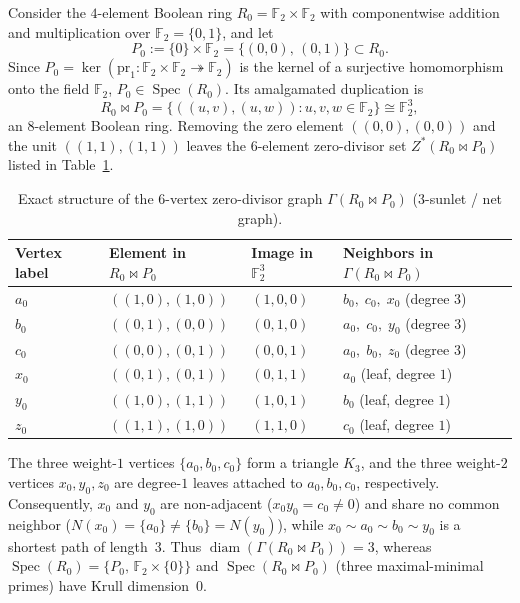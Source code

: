 \documentclass[11pt]{article}
\theoremstyle{definition}
\newcommand{\Spec}{\operatorname{Spec}}
\newcommand{\diam}{\operatorname{diam}}
\newcommand{\FF}{\mathbb{F}}
\begin{document}
Consider the $4$-element Boolean ring $R_0 = \FF_2 \times \FF_2$ with componentwise
addition and multiplication over $\FF_2 = \{0, 1\}$, and let
\[
  P_0 := \{0\} \times \FF_2 = \{(0, 0),\, (0, 1)\} \subset R_0.
\]
Since $P_0 = \ker(\mathrm{pr}_1 : \FF_2 \times \FF_2 \twoheadrightarrow \FF_2)$ is the
kernel of a surjective homomorphism onto the field $\FF_2$, $P_0 \in \Spec(R_0)$. Its
amalgamated duplication is
\[
  R_0 \bowtie P_0 = \{((u, v), (u, w)) : u, v, w \in \FF_2\} \cong \FF_2^3,
\]
an $8$-element Boolean ring. Removing the zero element $((0, 0), (0, 0))$ and the unit
$((1, 1), (1, 1))$ leaves the $6$-element zero-divisor set $Z^*(R_0 \bowtie P_0)$ listed in
Table~\ref{tab:minimal-zdg}.

\begin{table}[htbp]
\centering
\caption{Exact structure of the $6$-vertex zero-divisor graph $\Gamma(R_0 \bowtie P_0)$
($3$-sunlet / net graph).}\label{tab:minimal-zdg}
\smallskip
\begin{tabular}{@{}llll@{}}
\toprule
Vertex label & Element in $R_0 \bowtie P_0$ & Image in $\FF_2^3$ & Neighbors in $\Gamma(R_0 \bowtie P_0)$ \\
\midrule
$a_0$ & $((1, 0), (1, 0))$ & $(1, 0, 0)$ & $b_0,\; c_0,\; x_0$ \quad (degree $3$) \\
$b_0$ & $((0, 1), (0, 0))$ & $(0, 1, 0)$ & $a_0,\; c_0,\; y_0$ \quad (degree $3$) \\
$c_0$ & $((0, 0), (0, 1))$ & $(0, 0, 1)$ & $a_0,\; b_0,\; z_0$ \quad (degree $3$) \\
$x_0$ & $((0, 1), (0, 1))$ & $(0, 1, 1)$ & $a_0$ \quad (leaf, degree $1$) \\
$y_0$ & $((1, 0), (1, 1))$ & $(1, 0, 1)$ & $b_0$ \quad (leaf, degree $1$) \\
$z_0$ & $((1, 1), (1, 0))$ & $(1, 1, 0)$ & $c_0$ \quad (leaf, degree $1$) \\
\bottomrule
\end{tabular}
\end{table}

The three weight-$1$ vertices $\{a_0, b_0, c_0\}$ form a triangle $K_3$, and the three
weight-$2$ vertices $x_0, y_0, z_0$ are degree-$1$ leaves attached to $a_0, b_0, c_0$,
respectively. Consequently, $x_0$ and $y_0$ are non-adjacent ($x_0 y_0 = c_0 \neq 0$) and
share no common neighbor ($N(x_0) = \{a_0\} \neq \{b_0\} = N(y_0)$), while
$x_0 \sim a_0 \sim b_0 \sim y_0$ is a shortest path of length~$3$. Thus
$\diam(\Gamma(R_0 \bowtie P_0)) = 3$, whereas $\Spec(R_0) = \{P_0,\, \FF_2 \times \{0\}\}$
and $\Spec(R_0 \bowtie P_0)$ (three maximal-minimal primes) have Krull dimension~$0$.
\end{document}
